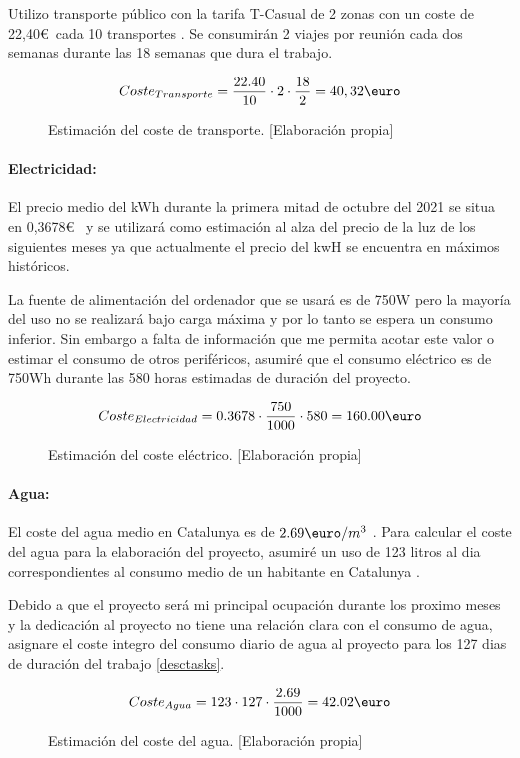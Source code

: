 Utilizo transporte público con la tarifa T-Casual de 2 zonas con un coste de 22,40\euro\ cada 10 transportes
\cite{Tcasualcost}. Se consumirán 2 viajes por reunión cada dos semanas durante las 18 semanas que dura el trabajo.
\begin{figure}[H]
    \begin{align*}
        Coste_{Transporte} = \frac{22.40}{10} \cdot 2 \cdot \frac{18}{2} = 40,32\text{\euro}
    \end{align*}
    \caption{Estimación del coste de transporte.  [Elaboración propia]}
\end{figure}

\paragraph{Electricidad:}
El precio medio del kWh durante la primera mitad de octubre del 2021 se situa en 0,3678\euro\ \cite{CosteLuz} y se utilizará como
estimación al alza del precio de la luz de los siguientes meses ya que actualmente el precio del kwH se encuentra
en máximos históricos.

La fuente de alimentación del ordenador que se usará es de 750W pero la mayoría del uso no se realizará bajo carga
máxima y por lo tanto se espera un consumo inferior. Sin embargo a falta de información que me permita acotar
este valor o estimar el consumo de otros periféricos, asumiré que el consumo eléctrico es de 750Wh durante las
580 horas estimadas de duración del proyecto.
\begin{figure}[ht]
    \begin{align*}
        Coste_{Electricidad} = 0.3678 \cdot \frac{750}{1000} \cdot 580 = 160.00\text{\euro}
    \end{align*}
    \caption{Estimación del coste eléctrico.  [Elaboración propia]}
\end{figure}

\paragraph{Agua:}
El coste del agua medio en Catalunya es de \( 2.69\text{\euro}/m^{3} \) \cite{CosteAgua}. Para calcular el coste del agua para
la elaboración del proyecto, asumiré un uso de 123 litros al dia correspondientes al consumo medio de un habitante
en Catalunya \cite{ConsumoAgua}.

Debido a que el proyecto será mi principal ocupación durante los proximo meses y 
la dedicación al proyecto no tiene una relación clara con el consumo de agua, asignare el coste integro del consumo
diario de agua al proyecto para los 127 dias de duración del trabajo \ref{desctasks}.
\begin{figure}[ht]
    \begin{align*}
        Coste_{Agua} = 123 \cdot 127 \cdot \frac{2.69}{1000} = 42.02\text{\euro}
    \end{align*}
    \caption{Estimación del coste del agua.  [Elaboración propia]}
\end{figure}


